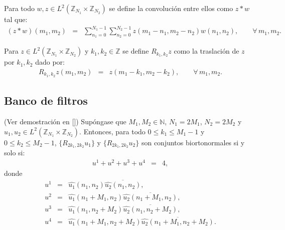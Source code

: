 \begin{definition}
Para todo $w,z\in L^2(\mathbb{Z}_{N_1}\times\mathbb{Z}_{N_2})$ se define la convoluci\'on entre ellos como $z\ast w$ tal que:
\begin{eqnarray}
(z\ast w)(m_1,m_2)&=&\sum_{n_1=0}^{N_1-1}\sum_{n_2=0}^{N_2-1}z(m_1-n_1,m_2-n_2)w(n_1,n_2),\qquad\forall\,m_1,m_2.\nonumber
\end{eqnarray}
\end{definition}

\begin{definition}
Para $z\in L^2(\mathbb{Z}_{N_1}\times\mathbb{Z}_{N_2})$ y $k_1,k_2\in\mathbb{Z}$ se define $R_{k_1,k_2}{z}$ como la traslaci\'on de $z$ por $k_1,k_2$ dado por:
\begin{eqnarray}
R_{k_1,k_2}{z}(m_1,m_2)&=&z(m_1-k_1,m_2-k_2),\qquad\forall\,m_1,m_2.\nonumber
\end{eqnarray}
\end{definition}

\subsection{Banco de filtros}

\begin{theorem}
(Ver demostraci\'on en [\textcolor{cyan}{\cite{12}}]) Sup\'ongase que $M_1,M_2\in\mathbb{N}$, $N_1=2M_1$, $N_2=2M_2$ y $u_1,u_2\in L^2(\mathbb{Z}_{N_1}\times\mathbb{Z}_{N_2})$. Entonces, para todo $0\leq k_1 \leq M_1-1$ y $0\leq k_2 \leq M_2-1$, $\{R_{2k_1,2k_2}u_1\}$ y $\{R_{2k_1,2k_2}u_2\}$ son conjuntos biortonormales si y solo si:
\begin{eqnarray}
u^1+u^2+u^3+u^4&=&4,\nonumber
\end{eqnarray}
donde
\begin{eqnarray}
u^1&=&\hat{u_1}(n_1,n_2)\overline{\hat{u_2}(n_1,n_2)},\nonumber\\
u^2&=&\hat{u_1}(n_1+M_1,n_2)\overline{\hat{u_2}(n_1+M_1,n_2)},\nonumber\\
u^3&=&\hat{u_1}(n_1,n_2+M_2)\overline{\hat{u_2}(n_1,n_2+M_2)},\nonumber\\
u^4&=&\hat{u_1}(n_1+M_1,n_2+M_2)\overline{\hat{u_2}(n_1+M_1,n_2+M_2)}.\nonumber
\end{eqnarray}
\end{theorem}

